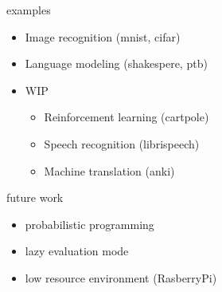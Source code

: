 \documentclass[aspectratio=169,
  14pt,xcolor=dvipsnames,table,professional font,dvipdfmx]{beamer}
\begin{document}
\begin{frame}{examples}
  \begin{itemize}
  \item Image recognition (mnist, cifar)
  \item Language modeling (shakespere, ptb)
  \item WIP
  \begin{itemize}
  \item Reinforcement learning (cartpole)
  \item Speech recognition (librispeech)
  \item Machine translation (anki)
  \end{itemize}
  \end{itemize}
\end{frame}

\begin{frame}{future work}
  \begin{itemize}
  \item probabilistic programming
  \item lazy evaluation mode
  \item low resource environment (RasberryPi)
  \end{itemize}
\end{frame}

	
\end{document}
